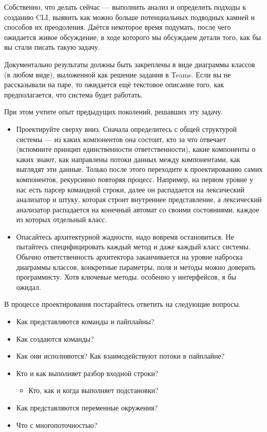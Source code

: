 \documentclass{../../text-style}
\begin{document}
Собственно, что делать сейчас --- выполнить анализ и определить подходы к созданию CLI, выявить как можно больше потенциальных подводных камней и способов их преодоления. Даётся некоторое время подумать, после чего ожидается живое обсуждение, в ходе которого мы обсуждаем детали того, как бы вы стали писать такую задачу.

Документально результаты должны быть закреплены в виде диаграммы классов (в любом виде), выложенной как решение задания в Teams. Если вы не рассказывали на паре, то ожидается ещё текстовое описание того, как предполагается, что система будет работать.

При этом учтите опыт предыдущих поколений, решавших эту задачу.
\begin{itemize}
    \item Проектируйте сверху вниз. Сначала определитесь с общей структурой системы --- из каких компонентов она состоит, кто за что отвечает (вспомните принцип единственности ответственности), какие компоненты о каких знают, как направлены потоки данных между компонентами, как выглядят эти данные. Только после этого переходите к проектированию самих компонентов, рекурсивно повторяя процесс. Например, на первом уровне у нас есть парсер командной строки, далее он распадается на лексический анализатор и штуку, которая строит внутреннее представление, а лексический анализатор распадается на конечный автомат со своими состояниями, каждое из которых отдельный класс.
    \item Опасайтесь архитектурной жадности, надо вовремя остановиться. Не пытайтесь специфицировать каждый метод и даже каждый класс системы. Обычно ответственность архитектора заканчивается на уровне наброска диаграммы классов, конкретные параметры, поля и методы можно доверить программисту. Хотя ключевые методы. особенно у интерфейсов, я бы ожидал.
\end{itemize}

В процессе проектирования постарайтесь ответить на следующие вопросы.

\begin{itemize}
    \item Как представляются команды и пайплайны?
    \item Как создаются команды?
    \item Как они исполняются? Как взаимодействуют потоки в пайплайне?
    \item Кто и как выполняет разбор входной строки?
    \begin{itemize}
        \item Кто, как и когда выполняет подстановки?
    \end{itemize}
    \item Как представляются переменные окружения?
    \item Что с многопоточностью?
\end{itemize}
\end{document}
